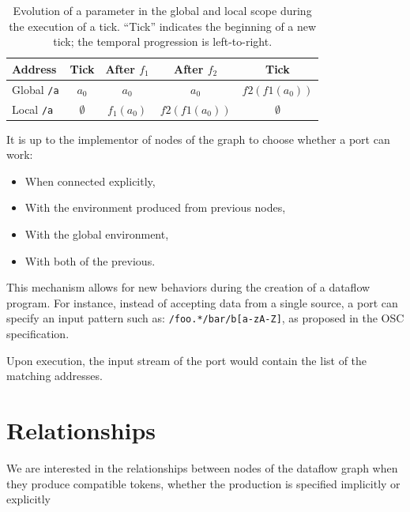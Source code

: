 \documentclass{article}
\begin{document}
\begin{table}[h]
	\centering
	\footnotesize
	\begin{tabular}{l|cccc}
		Address & Tick & After $f_1$ & After $f_2$ & Tick \\
		\midrule
		Global \lstinline|/a|  & $a_0$ & $a_0$ & $a_0$ & $f2(f1(a_0))$\\
		Local \lstinline|/a|   & $\emptyset$ & $f_1(a_0)$ & $f2(f1(a_0))$ & $\emptyset$ \\	
	\end{tabular}
	\caption{Evolution of a parameter in the global and local scope during the execution of a tick. 
        ``Tick'' indicates the beginning of a new tick; the temporal progression is left-to-right.}
	\label{tbl.evolution}
\end{table}

It is up to the implementor of nodes of the graph to choose whether a port can work: 
\begin{itemize}
  \item When connected explicitly,
  \item With the environment produced from previous nodes,
  \item With the global environment,
  \item With both of the previous.
\end{itemize} 

This mechanism allows for new behaviors during the creation of a dataflow program.
For instance, instead of accepting data from a single source, a port can specify an input pattern such as: \lstinline|/foo.*/bar/b[a-zA-Z]|, as proposed in the OSC specification.

Upon execution, the input stream of the port would contain the list of the matching addresses.

	
	
    
\section{Relationships}
\label{sec.relationships}
We are interested in the relationships between nodes of the dataflow graph when they produce compatible tokens, whether the production is specified implicitly or explicitly
    
\end{document}
